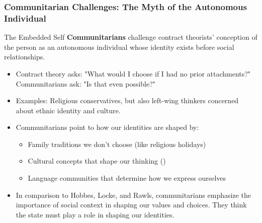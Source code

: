 \documentclass[aspectratio=169]{beamer}
\begin{document}
\begin{frame}
  \frametitle{Communitarian Challenges: The Myth of the Autonomous Individual}
  
  \begin{alertblock}{The Embedded Self}
    \textbf{Communitarians} challenge contract theorists' conception of the person as an autonomous individual whose identity exists before social relationships. 
  \end{alertblock}
  
  \begin{itemize}
    \item Contract theory asks: "What would I choose if I had no prior attachments?" Communitarians ask: "Is that even possible?"
    \item Examples: Religious conservatives,  but also left-wing thinkers concerned about ethnic identity and culture.
    \item Communitarians point to how our identities are shaped by:
      \begin{itemize}
        \item Family traditions we don't choose (like religious holidays)
        \item Cultural concepts that shape our thinking ()
        \item Language communities that determine how we express ourselves
      \end{itemize}
    \item In comparison to Hobbes, Locke, and Rawls, communitarians emphasize the importance of social context in shaping our values and choices. They think the state must play a role in shaping our identities.
  \end{itemize}
\end{frame}
\end{document}
